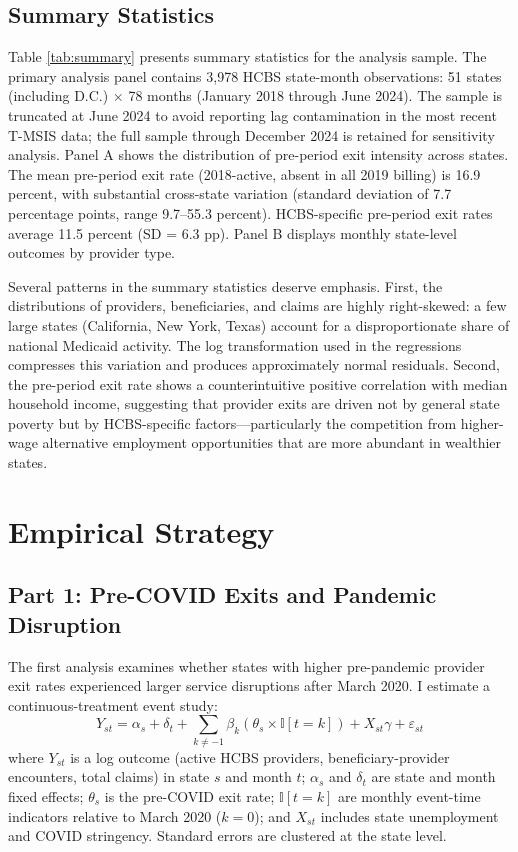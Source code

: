\documentclass[12pt]{article}
\newcommand{\ind}{\mathbb{I}}
\begin{document}
\subsection{Summary Statistics}



Table \ref{tab:summary} presents summary statistics for the analysis sample. The primary analysis panel contains 3,978 HCBS state-month observations: 51 states (including D.C.) $\times$ 78 months (January 2018 through June 2024). The sample is truncated at June 2024 to avoid reporting lag contamination in the most recent T-MSIS data; the full sample through December 2024 is retained for sensitivity analysis. Panel A shows the distribution of pre-period exit intensity across states. The mean pre-period exit rate (2018-active, absent in all 2019 billing) is 16.9 percent, with substantial cross-state variation (standard deviation of 7.7 percentage points, range 9.7--55.3 percent). HCBS-specific pre-period exit rates average 11.5 percent (SD = 6.3 pp). Panel B displays monthly state-level outcomes by provider type.

Several patterns in the summary statistics deserve emphasis. First, the distributions of providers, beneficiaries, and claims are highly right-skewed: a few large states (California, New York, Texas) account for a disproportionate share of national Medicaid activity. The log transformation used in the regressions compresses this variation and produces approximately normal residuals. Second, the pre-period exit rate shows a counterintuitive positive correlation with median household income, suggesting that provider exits are driven not by general state poverty but by HCBS-specific factors---particularly the competition from higher-wage alternative employment opportunities that are more abundant in wealthier states.


\section{Empirical Strategy}

\subsection{Part 1: Pre-COVID Exits and Pandemic Disruption}

The first analysis examines whether states with higher pre-pandemic provider exit rates experienced larger service disruptions after March 2020. I estimate a continuous-treatment event study:
\begin{equation}
Y_{st} = \alpha_s + \delta_t + \sum_{k \neq -1} \beta_k \left( \theta_s \times \ind[t = k] \right) + X_{st} \gamma + \varepsilon_{st}
\label{eq:eventstudy}
\end{equation}
where $Y_{st}$ is a log outcome (active HCBS providers, beneficiary-provider encounters, total claims) in state $s$ and month $t$; $\alpha_s$ and $\delta_t$ are state and month fixed effects; $\theta_s$ is the pre-COVID exit rate; $\ind[t = k]$ are monthly event-time indicators relative to March 2020 ($k = 0$); and $X_{st}$ includes state unemployment and COVID stringency. Standard errors are clustered at the state level.
\end{document}
